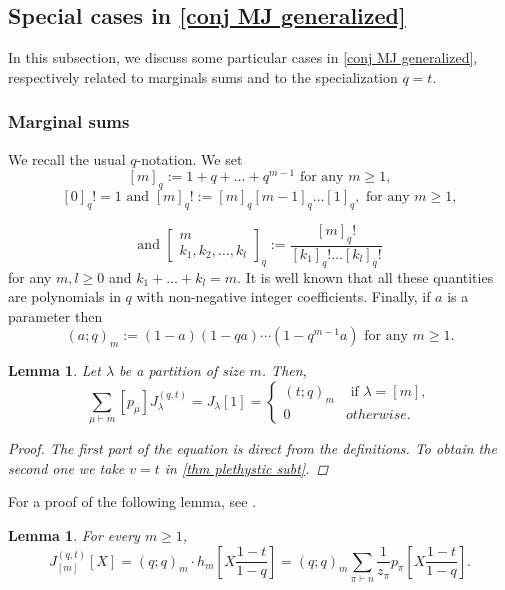 \documentclass[12pt]{amsart}
\newtheorem{lem}[thm]{Lemma}
\theoremstyle{remark}
\newcommand{\J}{{J}^{(q,t)}}
\begin{document}
\subsection{Special cases in \texorpdfstring{\cref{conj MJ generalized}}{}}\label{sec Special cases}
In this subsection, we discuss some particular cases in \cref{conj MJ generalized}, respectively related to marginals sums and to the specialization $q=t$.

\subsubsection{Marginal sums}
We recall the usual $q$-notation.
We set 
$$[m]_q:=1+q+\dots+q^{m-1} \text{ for any }  m\geq1,$$
$$[0]_q!=1 \text{ and }[m]_q!:=[m]_q[m-1]_q\dots[1]_q,\text{ for any }  m\geq1,$$

$$\text{and } \left[\begin{array}{c}
     m  \\
    k_1,k_2,\dots,k_l 
\end{array}\right]_q:=\frac{[m]_q!}{[k_1]_q!\dots [k_l]_q!}$$
for any $m,l\geq 0$ and $k_1+\dots+k_l=m$.
It is well known that all these quantities are polynomials in $q$ with non-negative integer coefficients. Finally, if $a$ is a parameter then
$$(a;q)_m:=(1-a)(1-qa)\cdots(1-q^{m-1}a) \text{ for any }m\geq 1.$$
\begin{lem}\label{lem J specialized in 1}
Let $\lambda$ be a partition of size $m$. Then,
    $$\sum_{\mu\vdash m}\left[p_\mu\right]\J_\lambda=J_\lambda[1]=\left\{\begin{array}{cc}
         (t;q)_m&\text{ if }\lambda=[m],  \\
         0& otherwise. 
    \end{array}\right.$$
    \begin{proof}
        The first part of the equation is direct from the definitions. To obtain the second one we take $v=t$ in \cref{thm plethystic subt}. 
    \end{proof}
\end{lem}
For a proof of the following lemma, see \cite[Chapter VI, Section 8, Example 1]{Macdonald1995}.
\begin{lem}\label{lem J_m}
    For every $m\geq1$,
    $$\J_{[m]}[X]=(q;q)_m\cdot h_m\left[X\frac{1-t}{1-q}\right]=(q;q)_m\sum_{\pi\vdash n}\frac{1}{z_\pi}p_\pi\left[X\frac{1-t}{1-q}\right].$$
\end{lem}
\end{document}
